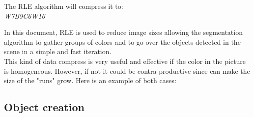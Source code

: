 The RLE algorithm will compress it to: \\
\textit{W7B9C6W16}

In this document, RLE is used to reduce image sizes allowing the segmentation algorithm to gather groups of colors and to go over the objects detected in the scene in a simple and fast iteration. \\

This kind of data compress is very useful and effective if the color in the picture is homogeneous. However, if not it could be contra-productive since can make the size of the "runs" grow. Here is an example of both cases: \\



\subsection{Object creation}

